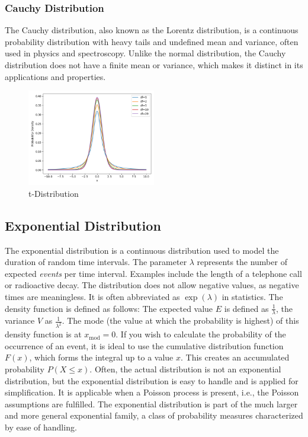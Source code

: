 \subsubsection{Cauchy Distribution}\label{Cauchy Distribution}
The Cauchy distribution, also known as the Lorentz distribution, is a continuous probability distribution with heavy tails and undefined mean and variance, often used in physics and spectroscopy. Unlike the normal distribution, the Cauchy distribution does not have a finite mean or variance, which makes it distinct in its applications and properties.

\begin{figure}[h]
    \centering
    \includegraphics[width=0.5\textwidth]{../images/plot_t_distributions_overlayed.png}
    \caption{t-Distribution}
    \label{fig:t_distribution}
\end{figure}

\subsection{Exponential Distribution}\label{Exponential Distribution}
The exponential distribution is a continuous distribution used to model the duration of random time intervals. The parameter $\lambda$ represents the number of expected \textit{events} per time interval. Examples include the length of a telephone call or radioactive decay. The distribution does not allow negative values, as negative times are meaningless. It is often abbreviated as $\exp(\lambda)$ in statistics. The density function is defined as follows:
The expected value $E$ is defined as $\frac{1}{\lambda}$, the variance $V$ as $\frac{1}{\lambda^2}$. The mode (the value at which the probability is highest) of this density function is at $x_{\text{mod}}=0$. If you wish to calculate the probability of the occurrence of an event, it is ideal to use the cumulative distribution function $F(x)$, which forms the integral up to a value $x$. This creates an accumulated probability $P(X\leq x)$. Often, the actual distribution is not an exponential distribution, but the exponential distribution is easy to handle and is applied for simplification. It is applicable when a Poisson process is present, i.e., the Poisson assumptions are fulfilled. The exponential distribution is part of the much larger and more general exponential family, a class of probability measures characterized by ease of handling.

